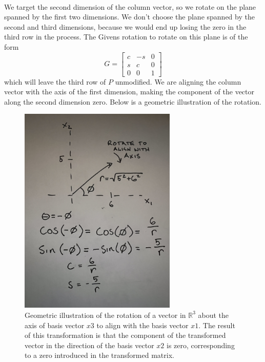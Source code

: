 \documentclass{article}
\begin{document}
\paragraph{}
We target the second dimension of the column vector, so we rotate on the plane spanned by 
the first two dimensions. We don’t choose the plane spanned by the second and third dimensions, 
because we would end up losing the zero in the third row in the process. The Givens rotation to rotate 
on this plane is of the form
\begin{equation}
G = 
\begin{bmatrix}
c & -s & 0\\
s & c & 0\\
0 & 0 & 1
\end{bmatrix}
\end{equation}
which will leave the third row of $P$ unmodified. We are aligning the column vector with the axis of the first 
dimension, making the component of the vector along the second dimension zero. Below is a geometric 
illustration of the rotation.

\begin{figure}[h]
\centering
\includegraphics[width=75mm, angle=-90]{Givens1}
\caption{Geometric illustration of the rotation of a vector in $\mathbb{R}^3$ about the axis of basis vector ${x3}$ to align with the basis vector ${x1}$. The result of this transformation is that the component of the transformed vector in the direction of the basis vector $x2$ is zero, corresponding to a zero introduced in the transformed matrix.}
\end{figure}
\end{document}
